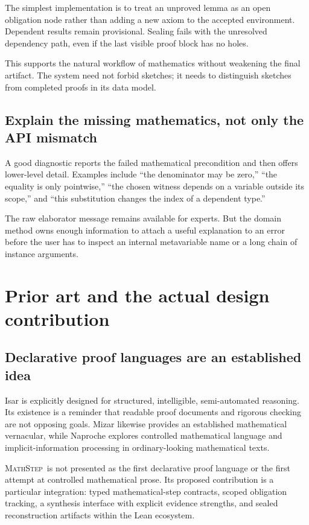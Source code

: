 \documentclass[11pt,a4paper]{article}
\theoremstyle{remark}
\newcommand{\ms}{\textsc{MathStep}}
\begin{document}
The simplest implementation is to treat an unproved lemma as an open obligation node rather than adding a new axiom to the accepted environment. Dependent results remain provisional. Sealing fails with the unresolved dependency path, even if the last visible proof block has no holes.

This supports the natural workflow of mathematics without weakening the final artifact. The system need not forbid sketches; it needs to distinguish sketches from completed proofs in its data model.

\subsection{Explain the missing mathematics, not only the API mismatch}
A good diagnostic reports the failed mathematical precondition and then offers lower-level detail. Examples include ``the denominator may be zero,'' ``the equality is only pointwise,'' ``the chosen witness depends on a variable outside its scope,'' and ``this substitution changes the index of a dependent type.''

The raw elaborator message remains available for experts. But the domain method owns enough information to attach a useful explanation to an error before the user has to inspect an internal metavariable name or a long chain of instance arguments.

\section{Prior art and the actual design contribution}\label{sec:prior}

\subsection{Declarative proof languages are an established idea}
Isar is explicitly designed for structured, intelligible, semi-automated reasoning. Its existence is a reminder that readable proof documents and rigorous checking are not opposing goals.\cite{isar} Mizar likewise provides an established mathematical vernacular, while Naproche explores controlled mathematical language and implicit-information processing in ordinary-looking mathematical texts.\cite{mizar,naproche}

\ms\ is not presented as the first declarative proof language or the first attempt at controlled mathematical prose. Its proposed contribution is a particular integration: typed mathematical-step contracts, scoped obligation tracking, a synthesis interface with explicit evidence strengths, and sealed reconstruction artifacts within the Lean ecosystem.
\end{document}
